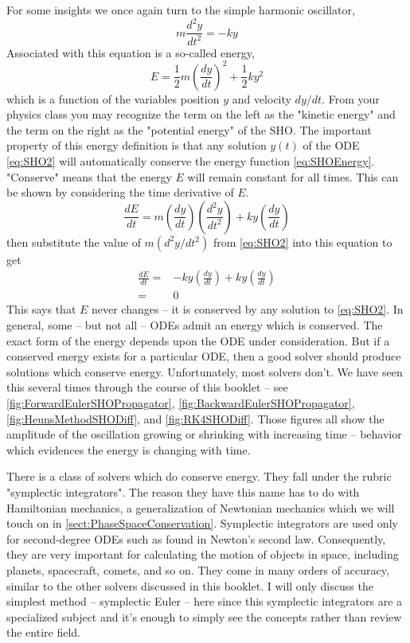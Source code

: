 \documentclass[hidelinks,notitlepage]{book}
\begin{document}
For some insights we once again turn to the simple harmonic oscillator,
\begin{equation}
\label{eq:SHO2}
m \frac{d^2 y}{d t^2} = -k y
\end{equation}
Associated with this equation is a so-called energy,
\begin{equation}
\label{eq:SHOEnergy}
E = \frac{1}{2} m \left( \frac{d y}{d t} \right)^2 + \frac{1}{2} k y^2 
\end{equation}
which is a function of the variables position $y$ and velocity $dy/dt$.  From your physics class you may recognize the term on the left as the "kinetic energy" and the term on the right as the "potential energy" of the SHO.  The important property of this energy definition is that any solution $y(t)$ of the ODE \cref{eq:SHO2} will automatically conserve the energy function \cref{eq:SHOEnergy}.  "Conserve" means that the energy $E$ will remain constant for all times.  This can be shown by considering the time derivative of $E$. 
\begin{equation}
\frac{d E}{d t} = m \left( \frac{d y}{d t} \right)\left( \frac{d^2 y}{d t^2} \right) + k y \left( \frac{d y}{d t} \right)
\end{equation}
then substitute the value of $m (d^2 y/d t^2)$ from \cref{eq:SHO2} into this equation to get
\begin{align}
\frac{d E}{d t} =& -k y \left( \frac{d y}{d t} \right) + k y \left( \frac{d y}{d t} \right) \\
=& 0
\end{align}
This says that $E$ never changes -- it is conserved by any solution to \cref{eq:SHO2}.  In general, some -- but not all -- ODEs admit an energy which is conserved.  The exact form of the energy depends upon the ODE under consideration.  But if a conserved energy exists for a particular ODE, then a good solver should produce solutions which conserve energy.  Unfortunately, most solvers don't.  We have seen this several times through the course of this booklet -- see \cref{fig:ForwardEulerSHOPropagator}, \cref{fig:BackwardEulerSHOPropagator}, \cref{fig:HeunsMethodSHODiff}, and \cref{fig:RK4SHODiff}.  Those figures all show the amplitude of the oscillation growing or shrinking with increasing time -- behavior which evidences the energy is changing with time.

There is a class of solvers which do conserve energy.  They fall under the rubric "symplectic integrators".  The reason they have this name has to do with Hamiltonian mechanics, a generalization of Newtonian mechanics which we will touch on in \cref{sect:PhaseSpaceConservation}.  Symplectic integrators are used only for second-degree ODEs such as found in Newton's second law.  Consequently, they are very important for calculating the motion of objects in space, including planets, spacecraft, comets, and so on.  They come in many orders of accuracy, similar to the other solvers discussed in this booklet.  I will only discuss the simplest method -- symplectic Euler -- here since this symplectic integrators are a specialized subject and it's enough to simply see the concepts rather than review the entire field.
\end{document}
